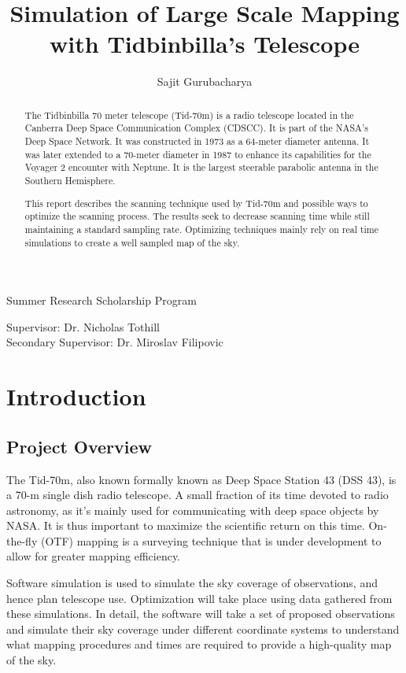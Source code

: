 \documentclass{article}%
\author{Sajit Gurubacharya}
\title{Simulation of Large Scale Mapping with Tidbinbilla's Telescope}
\begin{document}
\maketitle
\vskip 1.5in
\begin{center}
\begin{Large}
Summer Research Scholarship Program\\
\vskip 0.5in
\end{Large}
\begin{large}
Supervisor: Dr. Nicholas Tothill\\
Secondary Supervisor: Dr. Miroslav Filipovic
\end{large}
\end{center}
\newpage
\begin{abstract}
The Tidbinbilla 70 meter telescope (Tid-70m) is a radio telescope located in the Canberra Deep Space Communication Complex (CDSCC). It is part of the NASA's Deep Space Network. It was constructed in 1973 as a 64-meter diameter antenna. It was later extended to a 70-meter diameter in 1987 to enhance its capabilities for the Voyager 2 encounter with Neptune. It is the largest steerable parabolic antenna in the Southern Hemisphere.

This report describes the scanning technique used by Tid-70m and possible ways to optimize the scanning process. The results seek to decrease scanning time while still maintaining a standard sampling rate. Optimizing techniques mainly rely on real time simulations to create a well sampled map of the sky.

\end{abstract}
\newpage
\section{Introduction}
\subsection{Project Overview}
The Tid-70m, also known formally known as Deep Space Station 43 (DSS 43), is a 70-m single dish radio telescope. A small fraction of its time devoted to radio astronomy, as it's mainly used for communicating with deep space objects by NASA. It is thus important to maximize the scientific return on this time. On-the-fly (OTF) mapping is a surveying technique that is under development to allow for greater mapping efficiency. 

Software simulation is used to simulate the sky coverage of observations, and hence plan telescope use. Optimization will take place using data gathered from these simulations. In detail, the software will take a set of proposed observations and simulate their sky coverage under different coordinate systems to understand what mapping procedures and times are required to provide a high-quality map of the sky.
\end{document}
